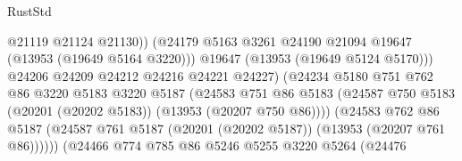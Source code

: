 \begin{lexlean}{RustStd}
\begin{coremodule}
                                            @21119
                                            @21124
                                            @21130))
                                        (@24179
                                          @5163
                                          @3261
                                          @24190
                                          @21094
                                          @19647
                                          (@13953 (@19649 @5164 @3220)))
                                        @19647
                                        (@13953 (@19649 @5124 @5170)))
                                      @24206
                                      @24209
                                      @24212
                                      @24216
                                      @24221
                                      @24227)
                                    (@24234
                                      @5180
                                      @751
                                      @762
                                      @86
                                      @3220
                                      @5183
                                      @3220
                                      @5187
                                      (@24583
                                        @751
                                        @86
                                        @5183
                                        (@24587
                                          @750
                                          @5183
                                          (@20201 (@20202 @5183))
                                          (@13953 (@20207 @750 @86))))
                                      (@24583
                                        @762
                                        @86
                                        @5187
                                        (@24587
                                          @761
                                          @5187
                                          (@20201 (@20202 @5187))
                                          (@13953 (@20207 @761 @86))))))
                                  (@24466
                                    @774
                                    @785
                                    @86
                                    @5246
                                    @5255
                                    @3220
                                    @5264
                                    (@24476

\end{coremodule}
\end{lexlean}
